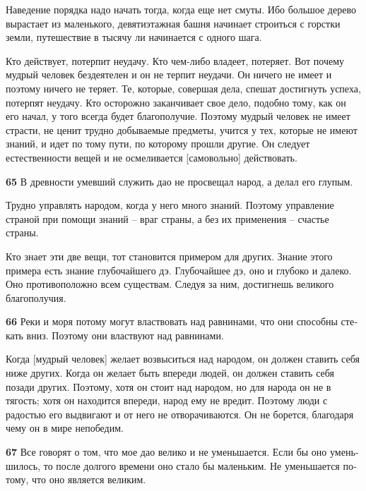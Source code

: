 \documentclass[a4paper]{article}
\begin{document}
{
Наведение порядка надо начать тогда, когда еще нет смуты. Ибо большое дерево вырастает из маленького, девятиэтажная
башня начинает строиться с горстки земли, путешествие в тысячу ли начинается с одного шага.}

{
Кто действует, потерпит неудачу. Кто чем-либо владеет, потеряет. Вот почему мудрый человек бездеятелен и он не терпит
неудачи. Он ничего не имеет и поэтому ничего не теряет. Те, которые, совершая дела, спешат достигнуть успеха, потерпят
неудачу. Кто осторожно заканчивает свое дело, подобно тому, как он его начал, у того всегда будет благополучие. Поэтому
мудрый человек не имеет страсти, не ценит трудно добываемые предметы, учится у тех, которые не имеют знаний, и идет по
тому пути, по которому прошли другие. Он следует естественности вещей и не осмеливается [самовольно] действовать.}

{\ttfamily
\foreignlanguage{russian}{\textrm{\textbf{65}}}\foreignlanguage{russian}{\textrm{ В древности умевший служить дао не
просвещал народ, а делал его глупым.}}}

{
Трудно управлять народом, когда у него много знаний. Поэтому управление страной при помощи знаний – враг страны, а без
их применения – счастье страны.}

{
Кто знает эти две вещи, тот становится примером для других. Знание этого примера есть знание глубочайшего дэ.
Глубочайшее дэ, оно и глубоко и далеко. Оно противоположно всем существам. Следуя за ним, достигнешь великого
благополучия.}

{\ttfamily
\foreignlanguage{russian}{\textrm{\textbf{66}}}\foreignlanguage{russian}{\textrm{ Реки и моря потому могут властвовать
над равнинами, что они способны стекать вниз. Поэтому они властвуют над равнинами.}}}

{
Когда [мудрый человек] желает возвыситься над народом, он должен ставить себя ниже других. Когда он желает быть впереди
людей, он должен ставить себя позади других. Поэтому, хотя он стоит над народом, но для народа он не в тягость; хотя он
находится впереди, народ ему не вредит. Поэтому люди с радостью его выдвигают и от него не отворачиваются. Он не
борется, благодаря чему он в мире непобедим.}

{\ttfamily
\foreignlanguage{russian}{\textrm{\textbf{67}}}\foreignlanguage{russian}{\textrm{ Все говорят о том, что мое дао велико
и не уменьшается. Если бы оно уменьшилось, то после долгого времени оно стало бы маленьким. Не уменьшается потому, что
оно является великим.}}}
\end{document}
